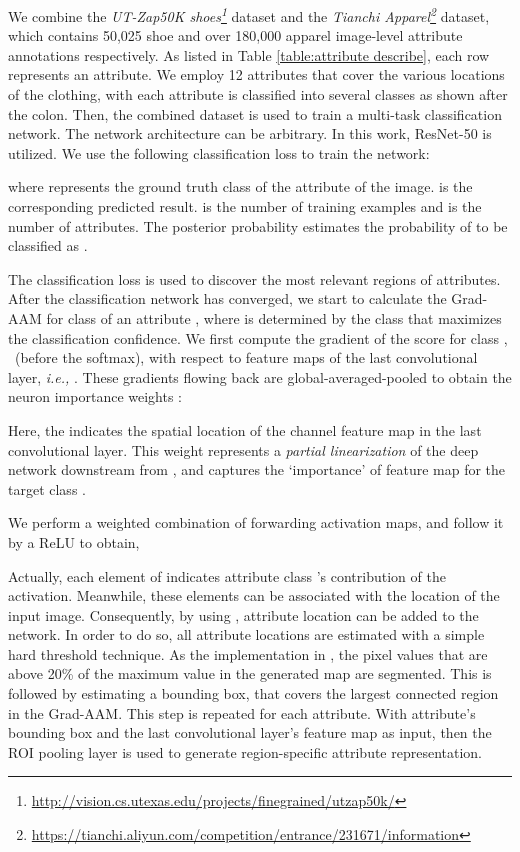 \documentclass{article}
\begin{document}
We combine the \textit{UT-Zap50K shoes\footnote{\url{http://vision.cs.utexas.edu/projects/finegrained/utzap50k/}}} dataset and the \textit{Tianchi Apparel\footnote{\url{https://tianchi.aliyun.com/competition/entrance/231671/information}}} dataset, which contains 50,025 shoe and over 180,000 apparel image-level attribute annotations respectively. As listed in Table \ref{table:attribute describe}, each row represents an attribute. We employ 12 attributes that cover the various locations of the clothing, with each attribute is classified into several classes as shown after the colon. Then, the combined dataset is used to train a multi-task classification network. The network architecture can be arbitrary. In this work, ResNet-50 \cite{he2016deep} is utilized. We use the following classification loss to train the network:

where  represents the ground truth class of the  attribute of the  image.  is the corresponding predicted result.  is the number of training examples and  is the number of attributes. The posterior probability estimates the probability of  to be classified as .

The classification loss is used to discover the most relevant regions of attributes. After the classification network has converged, we start to calculate the Grad-AAM  for class  of an attribute , where  is determined by the class that maximizes the classification confidence. We first compute the gradient of the score for class , ~(before the softmax), with respect to feature maps  of the last convolutional layer, \textit{i.e.,} . These gradients flowing back are global-averaged-pooled to obtain the neuron importance weights :


Here, the  indicates the spatial location of the  channel feature map  in the last convolutional layer. This weight  represents a \textit{partial linearization} of the deep network downstream from , and captures the `importance' of feature map  for the target class .

We perform a weighted combination of forwarding activation maps, and follow it by a ReLU to obtain,


Actually, each element of  indicates attribute class 's contribution of the activation. Meanwhile, these elements can be associated with the location of the input image. Consequently, by using , attribute location can be added to the network. In order to do so, all attribute locations are estimated with a simple hard threshold technique. As the implementation in \cite{ak2018learning}, the pixel values that are above 20\% of the maximum value in the generated map are segmented. This is followed by estimating a bounding box, that covers the largest connected region in the Grad-AAM. This step is repeated for each attribute. With attribute's bounding box and the last convolutional layer's feature map as input, then the ROI pooling layer \cite{girshick2015fast} is used to generate region-specific attribute representation. 
\end{document}

